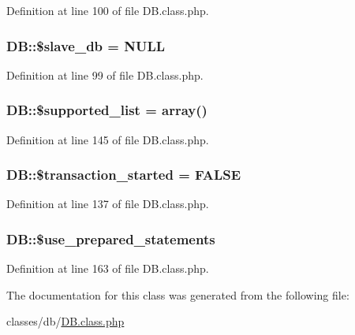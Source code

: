 Definition at line 100 of file D\+B.\+class.\+php.

\hypertarget{classDB_a0a811a4446882ee9edf0ed846e8926f3}{}
\subsubsection[{\$slave\+\_\+db}]{\setlength{\rightskip}{0pt plus 5cm}D\+B\+::\$slave\+\_\+db = N\+U\+L\+L}\label{classDB_a0a811a4446882ee9edf0ed846e8926f3}


Definition at line 99 of file D\+B.\+class.\+php.

\hypertarget{classDB_ac09dd547a22963632e063c9ab68b7707}{}
\subsubsection[{\$supported\+\_\+list}]{\setlength{\rightskip}{0pt plus 5cm}D\+B\+::\$supported\+\_\+list = array()}\label{classDB_ac09dd547a22963632e063c9ab68b7707}


Definition at line 145 of file D\+B.\+class.\+php.

\hypertarget{classDB_a39a0eef56f82082ca4c69bcad1f12a31}{}
\subsubsection[{\$transaction\+\_\+started}]{\setlength{\rightskip}{0pt plus 5cm}D\+B\+::\$transaction\+\_\+started = F\+A\+L\+S\+E}\label{classDB_a39a0eef56f82082ca4c69bcad1f12a31}


Definition at line 137 of file D\+B.\+class.\+php.

\hypertarget{classDB_a9902aee7d8900a597670fce92c7eb74b}{}
\subsubsection[{\$use\+\_\+prepared\+\_\+statements}]{\setlength{\rightskip}{0pt plus 5cm}D\+B\+::\$use\+\_\+prepared\+\_\+statements}\label{classDB_a9902aee7d8900a597670fce92c7eb74b}


Definition at line 163 of file D\+B.\+class.\+php.



The documentation for this class was generated from the following file\+:\begin{DoxyCompactItemize}
\item 
classes/db/\hyperlink{DB_8class_8php}{D\+B.\+class.\+php}\end{DoxyCompactItemize}
